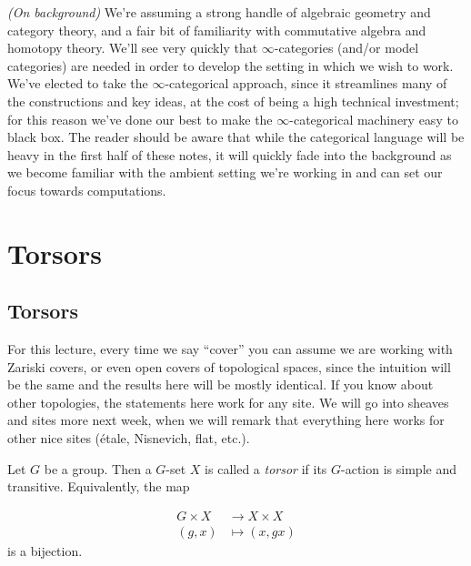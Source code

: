 \documentclass[11pt,openany]{book}
\begin{document}
\begin{remark} \textit{(On background)} We're assuming a strong handle of algebraic geometry and category theory, and a fair bit of familiarity with commutative algebra and homotopy theory. We'll see very quickly that $\infty$-categories (and/or model categories) are needed in order to develop the setting in which we wish to work. We've elected to take the $\infty$-categorical approach, since it streamlines many of the constructions and key ideas, at the cost of being a high technical investment; for this reason we've done our best to make the $\infty$-categorical machinery easy to black box. The reader should be aware that while the categorical language will be heavy in the first half of these notes, it will quickly fade into the background as we become familiar with the ambient setting we're working in and can set our focus towards computations.
\end{remark}

\chapter{Torsors}
\minitoc
\section{Torsors}

\begin{assumption} For this lecture, every time we say ``cover'' you can assume we are working with Zariski covers, or even open covers of topological spaces, since the intuition will be the same and the results here will be mostly identical. If you know about other topologies, the statements here work for any site. We will go into sheaves and sites more next week, when we will remark that everything here works for other nice sites (\'etale, Nisnevich, flat, etc.).
\end{assumption}

\begin{definition} Let $G$ be a group. Then a $G$-set $X$ is called a \textit{torsor} if its $G$-action is simple and transitive. Equivalently, the map

\begin{equation}\label{eqn:torsor-G-set}
\begin{aligned}
    G \times X &\to X \times X \\
    (g,x) &\mapsto (x,gx)
\end{aligned}
\end{equation}
is a bijection.
\end{definition}
\end{document}
